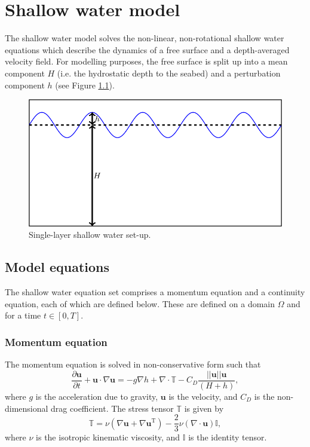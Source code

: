 \documentclass[a4paper,11pt]{report}
\begin{document}
\chapter{Shallow water model}
The shallow water model solves the non-linear, non-rotational shallow water equations which describe the dynamics of a free surface and a depth-averaged velocity field. For modelling purposes, the free surface is split up into a mean component $H$ (i.e. the hydrostatic depth to the seabed) and a perturbation component $h$ (see Figure \ref{fig:shallow_water_setup}).

\begin{figure}
   \centering
   \includegraphics[width=0.6\columnwidth]{images/shallow_water_h_H.png}
   \caption{Single-layer shallow water set-up.}
   \label{fig:shallow_water_setup}
\end{figure}

\section{Model equations}\label{sect:model_equations}
The shallow water equation set comprises a momentum equation and a continuity equation, each of which are defined below. These are defined on a domain $\Omega$ and for a time $t \in [0, T]$.

\subsection{Momentum equation}
The momentum equation is solved in non-conservative form such that
\begin{equation}
   \frac{\partial \mathbf{u}}{\partial t} + \mathbf{u}\cdot\nabla\mathbf{u} = -g\nabla h + \nabla\cdot\mathbb{T} - C_D\frac{||\mathbf{u}||\mathbf{u}}{(H + h)},
\end{equation}
where $g$ is the acceleration due to gravity, $\mathbf{u}$ is the velocity, and $C_D$ is the non-dimensional drag coefficient. The stress tensor $\mathbb{T}$ is given by 
\begin{equation}
   \mathbb{T} = \nu\left(\nabla\mathbf{u} + \nabla\mathbf{u}^{\mathrm{T}}\right) - \frac{2}{3}\nu\left(\nabla\cdot\mathbf{u}\right)\mathbb{I},
\end{equation}
where $\nu$ is the isotropic kinematic viscosity, and $\mathbb{I}$ is the identity tensor.
\end{document}
